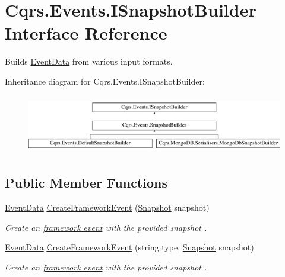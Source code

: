 \hypertarget{interfaceCqrs_1_1Events_1_1ISnapshotBuilder}{}\section{Cqrs.\+Events.\+I\+Snapshot\+Builder Interface Reference}
\label{interfaceCqrs_1_1Events_1_1ISnapshotBuilder}


Builds \hyperlink{classCqrs_1_1Events_1_1EventData}{Event\+Data} from various input formats.  


Inheritance diagram for Cqrs.\+Events.\+I\+Snapshot\+Builder\+:\begin{figure}[H]
\begin{center}
\leavevmode
\includegraphics[height=2.616822cm]{interfaceCqrs_1_1Events_1_1ISnapshotBuilder}
\end{center}
\end{figure}
\subsection*{Public Member Functions}
\begin{DoxyCompactItemize}
\item 
\hyperlink{classCqrs_1_1Events_1_1EventData}{Event\+Data} \hyperlink{interfaceCqrs_1_1Events_1_1ISnapshotBuilder_afb318f1c84773084414b907e75c4aa0a_afb318f1c84773084414b907e75c4aa0a}{Create\+Framework\+Event} (\hyperlink{classCqrs_1_1Snapshots_1_1Snapshot}{Snapshot} snapshot)
\begin{DoxyCompactList}\small\item\em Create an \hyperlink{}{framework event} with the provided {\itshape snapshot} . \end{DoxyCompactList}\item 
\hyperlink{classCqrs_1_1Events_1_1EventData}{Event\+Data} \hyperlink{interfaceCqrs_1_1Events_1_1ISnapshotBuilder_a2f06f7a8f0995aabb90a0e8152271426_a2f06f7a8f0995aabb90a0e8152271426}{Create\+Framework\+Event} (string type, \hyperlink{classCqrs_1_1Snapshots_1_1Snapshot}{Snapshot} snapshot)
\begin{DoxyCompactList}\small\item\em Create an \hyperlink{}{framework event} with the provided {\itshape snapshot} . \end{DoxyCompactList}\end{DoxyCompactItemize}


